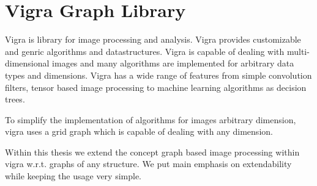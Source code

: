 \bigskip
\chapter{Vigra Graph Library} \label{ch:vigra_graph_lib}

Vigra \cite{software_vigra} is library for image processing and analysis.
Vigra provides customizable and genric algorithms and datastructures.
Vigra is capable of dealing with multi-dimensional images 
and many algorithms are implemented for arbitrary data types
and dimensions.
Vigra has a wide range of features from simple convolution filters, 
tensor based image processing to machine learning algorithms 
as decision trees.

To simplify the implementation of algorithms for images arbitrary 
dimension, vigra uses a grid graph which is capable of
dealing with any dimension.

Within this thesis we extend the concept graph based image processing
within vigra w.r.t. graphs of any structure.
We put main emphasis on extendability while keeping the usage very simple.


 

 

 